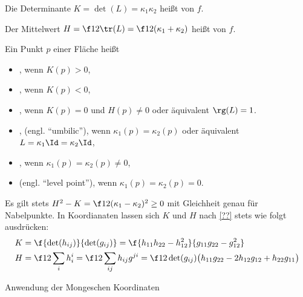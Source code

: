 \begin{df}
	Die Determinante $K = \det(L) = \kappa_1 \kappa_2$ heißt  von $f$.

	Der Mittelwert $H = \f 12 \tr(L) = \f 12 (\kappa_1 + \kappa_2)$ heißt  von $f$.

	Ein Punkt $p$ einer Fläche heißt
	\begin{itemize}
		\item
			, wenn $K(p) > 0$,
		\item
			, wenn $K(p) < 0$,
		\item
			, wenn $K(p) = 0$ und $H(p) \neq 0$ oder äquivalent $\rg(L) = 1$.
		\item
			, (engl. “umbilic”), wenn $\kappa_1(p) = \kappa_2(p)$ oder äquivalent $L = \kappa_1 \Id = \kappa_2 \Id$,
		\item
			, wenn $\kappa_1(p) = \kappa_2(p) \neq 0$,
		\item
			 (engl. “level point”), wenn $\kappa_1(p) = \kappa_2(p) = 0$.
	\end{itemize}
\end{df}

\begin{kor}
	Es gilt stets $H^2 - K = \f 12 (\kappa_1 - \kappa_2)^2 \ge 0$ mit Gleichheit genau für Nabelpunkte.
	In Koordianaten lassen sich $K$ und $H$ nach \ref{??} stets wie folgt ausdrücken:
	\begin{align*}
		K &= \f{\det(h_{ij})}{\det(g_{ij})}
		= \f{h_{11}h_{22} - h_{12}^2}{g_{11}g_{22} - g_{12}^2} \\
		H &= \f 12 \sum_{i} h_{i}^i = \f 12 \sum_{ij} h_{ij} g^{ji}
		= \f 1{2\det(g_{ij})} \big( h_{11} g_{22} - 2h_{12}g_{12} + h_{22}g_{11} \big)
	\end{align*}
\end{kor}


Anwendung der Mongeschen Koordinaten

